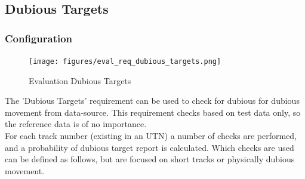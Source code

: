 
\subsection{Dubious Targets}
\label{sec:eval_req_dubious_targets} 

\subsubsection{Configuration}

\begin{figure}[H]
    \texttt{[image: figures/eval\_req\_dubious\_targets.png]}
   \caption{Evaluation Dubious Targets}
\end{figure}

The 'Dubious Targets' requirement can be used to check for dubious for dubious movement from data-source. This requirement checks based on test data only, so the reference data is of no importance. \\

For each track number (existing in an UTN) a number of checks are performed, and a probability of dubious target report is calculated. Which checks are used can be defined as follows, but are focused on short tracks or physically dubious movement. \\

